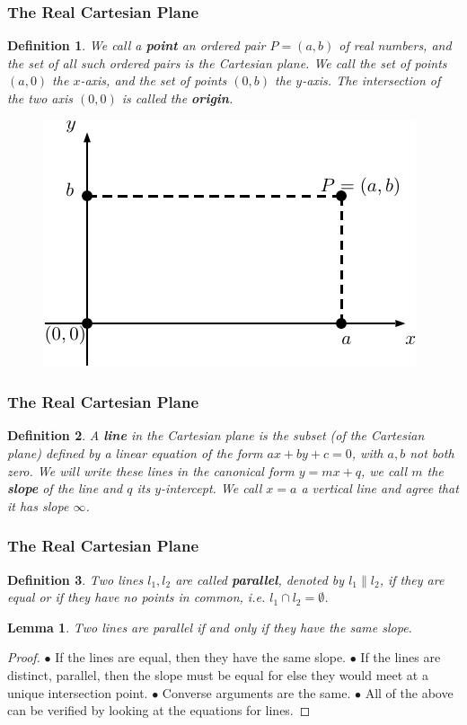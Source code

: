 \documentclass[compress,mathserif,serif]{beamer}
\newtheorem{Con}{Lemma}
\newtheorem{dfn}{Definition}
\begin{document}
\begin{frame}
\frametitle{The Real Cartesian Plane}
\begin{dfn}
We call a \textbf{point} an ordered pair $P=(a,b)$ of real numbers, and the set of all such ordered pairs is the Cartesian plane. We call the set of points $(a,0)$ the $x$-axis, and the set of points $(0,b)$ the $y$-axis. The intersection of the two axis $(0,0)$ is called the \textbf{origin}.
\end{dfn}
\pause
\begin{figure}[hbtp]
\centering
\includegraphics[scale=.9]{cartplane.pdf}
\end{figure}
\end{frame}

\begin{frame}
\frametitle{The Real Cartesian Plane}
\begin{dfn}A \textbf{line} in the Cartesian plane is the subset (of the Cartesian plane) defined by a linear equation of the form $ax+by+c=0$, with $a,b$ not both zero. We will write these lines in the canonical form $y=mx+q$, we call $m$ the \textbf{slope} of the line and $q$ its $y$-intercept. We call $x=a$ a vertical line and agree that it has slope $\infty$. 
\end{dfn}
\end{frame}


\begin{frame}
\frametitle{The Real Cartesian Plane}
\begin{dfn}Two lines $l_1,l_2$ are called \textbf{parallel}, denoted by $l_1 \| l_2$, if they are equal or if they have no points in common, i.e. $l_1 \cap l_2 = \emptyset$.
\end{dfn}
\pause
\begin{Con} Two lines are parallel if and only if they have the same slope.
\end{Con}
\pause
\begin{proof}
$\bullet$ If the lines are equal, then they have the same slope.
\pause
\newline
$\bullet$ If the lines are distinct, parallel, then the slope must be equal for else they would meet at a unique intersection point.
\pause
\newline $\bullet$ Converse arguments are the same. 
\pause
\newline $\bullet$ All of the above can be verified by looking at the equations for lines. 
\end{proof}
\end{frame}
\end{document}
